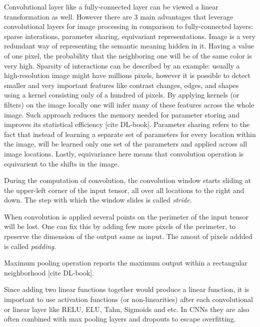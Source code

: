 Convolutional layer like a fully-connected layer can be viewed a linear transformation as well. However there are 3 main advantages that leverage convolutional layers for image processing in comparison to fully-connected layers: sparse interations, parameter sharing, equivariant representations. Image is a very redundant way of representing the semantic meaning hidden in it. Having a value of one pixel, the probability that the neighboring one will be of the same color is very high. Sparsity of interactions can be described by an example: usually a high-resolution image might have millions pixels, however it is possible to detect smaller and very important features like contrast changes, edges, and shapes using a kernel consisting only of a hundred of pixels. By applying kernels (or filters) on the image locally one will infer many of these features across the whole image. Such approach reduces the memory needed for parameter storing and improves its statistical eﬃciency [cite DL-book]. Parameter sharing refers to the fact that instead of learning a separate set of parameters for every location within the image, will be learned only one set of the parameters and applied across all image locations. Lastly, equivariance here means that convolution operation is equivarient to the shifts in the image.

\begin{definition}[Stride]
	During the computation of convolution, the convolution window starts sliding at the upper-left corner of the input tensor, all over all locations to the right and down. The step with which the window slides is called \textit{stride}. 
\end{definition}

\begin{definition}[Padding]
	When convolution is applied several points on the perimeter of the input tensor will be lost. One can fix this by adding few more pixels of the perimeter, to rpeserve the dimension of the output same as input. The amout of pixels addded is called
	\textit{padding}. 
\end{definition}

\begin{definition}
	Maximum pooling operation reports the maximum output within a rectangular neighborhood [cite DL-book].
\end{definition}


Since adding two linear functions together would produce a linear function, it is important to use activation functions (or non-linearities) after each convolutional or linear layer like RELU, ELU, Tahn, Sigmoids and etc. In CNNs they are also often combined with max pooling layers and dropouts to escape overfitting. 


